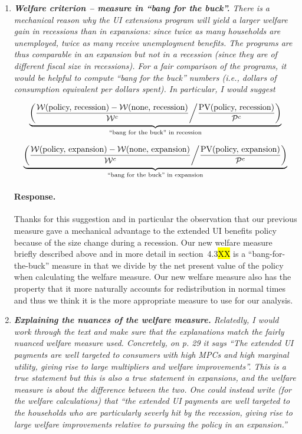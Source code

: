 \documentclass[12pt,letterpaper,english]{article}
\begin{document}
\begin{enumerate}
	\item \textit{\textbf{Welfare criterion – measure in ``bang for the buck''.} There is a mechanical reason why the UI extensions program will yield a larger welfare gain in recessions than in expansions: since twice as many households are unemployed, twice as many receive unemployment benefits. The programs are thus comparable in an expansion	but not in a recession (since they are of different fiscal size in recessions).	For a fair comparison of the programs, it would be helpful to compute ``bang for the buck'' numbers (i.e., dollars of consumption equivalent per dollars spent). In particular, I would suggest} 
	
	\[ \underbrace{\left( \frac{\mathcal{W}(\text{policy, recession}) - \mathcal{W}(\text{none, recession})}{\mathcal{W}^c} \middle/ \frac{\text{PV}(\text{policy, recession})}{\mathcal{P}^c} \right)}_{\text{``bang for the buck'' in recession}} \]
	
	\[ \underbrace{\left( \frac{\mathcal{W}(\text{policy, expansion}) - \mathcal{W}(\text{none, expansion})}{\mathcal{W}^c} \middle/ \frac{\text{PV}(\text{policy, expansion})}{\mathcal{P}^c} \right)}_{\text{``bang for the buck'' in expansion}} \]

	\paragraph{Response.} Thanks for this suggestion and in particular the observation that our previous measure gave a mechanical advantage to the extended UI benefits policy because of the size change during a recession. Our new welfare measure briefly described above and in more detail in section~4.3\hl{XX} is a ``bang-for-the-buck'' measure in that we divide by the net present value of the policy when calculating the welfare measure. Our new welfare measure also has the property that it more naturally accounts for redistribution in normal times and thus we think it is the more appropriate measure to use for our analysis.

	\item \textit{\textbf{Explaining the nuances of the welfare measure.} Relatedly, I would work through the text and make sure that the explanations	match the fairly nuanced welfare measure used. Concretely, on p. 29 it says ``The extended UI payments are well targeted to consumers with high MPCs and high marginal utility, giving rise to large multipliers and welfare improvements''. This is a true statement but this is also a true statement in expansions, and the welfare measure is about the difference between the two. One could instead write (for the welfare calculations) that ``the extended UI payments are well targeted to the households who are particularly severly hit by the recession, giving rise to large welfare improvements relative to pursuing the policy in an expansion.''} 
	

\end{enumerate}
\end{document}
